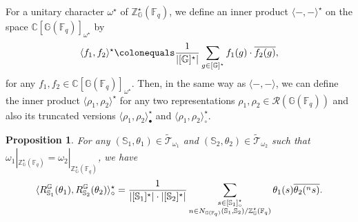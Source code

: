 \documentclass{amsart}
\newcommand{\cT}{\mathcal{T}}
\newcommand{\F}{\mathbb{F}}
\newcommand{\FF}{\mathbb{F}}
\newcommand{\C}{\mathbb{C}}
\newcommand{\bbS}{\mathbb{S}}
\newcommand{\bbG}{\mathbb{G}}
\newcommand{\bbZ}{\mathbb{Z}}
\newcommand{\cR}{\mathcal{R}}
\theoremstyle{plain}
\newtheorem{prop}[thm]{Proposition}
\theoremstyle{definition}
\theoremstyle{remark}
\theoremstyle{theorem}
\begin{document}
For a unitary character $\omega^{\star}$ of $\bbZ^{\star}_\bbG(\FF_q)$, we define an inner product $\langle-,-\rangle^{\star}$ on the space $\C[\bbG(\F_{q})]_{\omega^{\star}}$ by
\[
\langle f_{1},f_{2} \rangle^{\star}
\colonequals
\frac{1}{|[\bbG]^{\star}|} \sum_{g\in[\bbG]^{\star}}f_1(g) \cdot \overline{f_2(g)},
\]
for any $f_{1},f_{2}\in\C[\bbG(\F_{q})]_{\omega^{\star}}$.
Then, in the same way as $\langle-,-\rangle$, we can define the inner product $\langle \rho_{1}, \rho_{2} \rangle^{\star}$ for any two representations $\rho_1, \rho_2 \in \cR(\bbG(\FF_q))$ and also its truncated versions $\langle \rho_{1}, \rho_{2} \rangle^{\star}_{\bullet}$ and $\langle \rho_{1}, \rho_{2} \rangle^{\star}_{\circ}$.

\begin{prop}\label{prop:innerprod2}
For any $(\bbS_1, \theta_1)\in\tilde{\cT}_{\omega_{1}}$ and $(\bbS_2,\theta_2) \in\tilde{\cT}_{\omega_{2}}$ such that $\omega_{1}|_{\bbZ^{\star}_\bbG(\FF_q)}=\omega_{2}|_{\bbZ^{\star}_\bbG(\FF_q)}$, we have
\[
\langle R_{\bbS_1}^{\bbG}(\theta_1),R_{\bbS_2}^{\bbG}(\theta_2)\rangle^{\star}_{\circ}
=
\frac{1}{|[\bbS_{1}]^{\star}|\cdot|[\bbS_{2}]^{\star}|}
\sum_{\begin{subarray}{c}s\in[\bbS_{1}]^{\star}_{\circ} \\ n\in N_{\bbG(\F_{q})}(\bbS_{1},\bbS_{2})/\bbZ^{\star}_{\bbG}(\F_{q})\end{subarray}}
\theta_{1}(s)\overline{\theta_{2}({}^{n}s)}.
\]
\end{prop}
\end{document}

